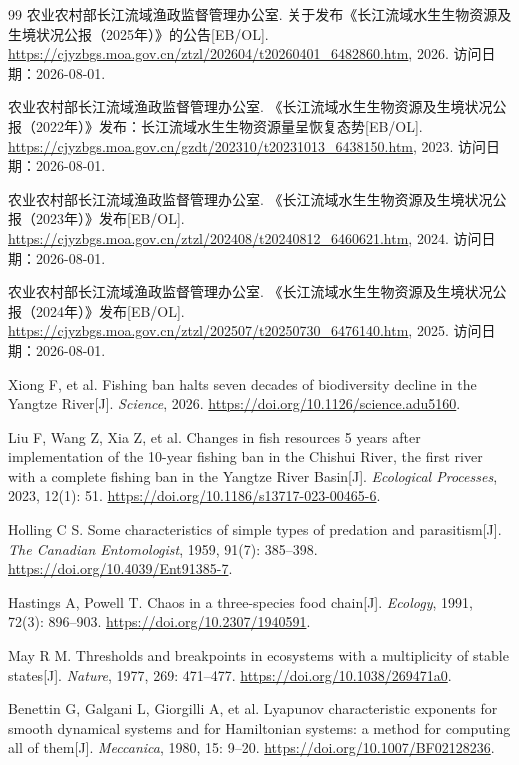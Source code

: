 \documentclass[withoutpreface,bwprint]{cumcmthesis}
\begin{document}
\begin{thebibliography}{99}
农业农村部长江流域渔政监督管理办公室.
关于发布《长江流域水生生物资源及生境状况公报（2025年）》的公告[EB/OL].
\url{https://cjyzbgs.moa.gov.cn/ztzl/202604/t20260401_6482860.htm}, 2026. 访问日期：2026-08-01.

农业农村部长江流域渔政监督管理办公室.
《长江流域水生生物资源及生境状况公报（2022年）》发布：长江流域水生生物资源量呈恢复态势[EB/OL].
\url{https://cjyzbgs.moa.gov.cn/gzdt/202310/t20231013_6438150.htm}, 2023. 访问日期：2026-08-01.

农业农村部长江流域渔政监督管理办公室.
《长江流域水生生物资源及生境状况公报（2023年）》发布[EB/OL].
\url{https://cjyzbgs.moa.gov.cn/ztzl/202408/t20240812_6460621.htm}, 2024. 访问日期：2026-08-01.

农业农村部长江流域渔政监督管理办公室.
《长江流域水生生物资源及生境状况公报（2024年）》发布[EB/OL].
\url{https://cjyzbgs.moa.gov.cn/ztzl/202507/t20250730_6476140.htm}, 2025. 访问日期：2026-08-01.

Xiong F, et al. Fishing ban halts seven decades of biodiversity decline in the Yangtze River[J].
\textit{Science}, 2026. \url{https://doi.org/10.1126/science.adu5160}.

Liu F, Wang Z, Xia Z, et al. Changes in fish resources 5 years after implementation of the 10-year fishing ban in the Chishui River, the first river with a complete fishing ban in the Yangtze River Basin[J].
\textit{Ecological Processes}, 2023, 12(1): 51.
\url{https://doi.org/10.1186/s13717-023-00465-6}.

Holling C S. Some characteristics of simple types of predation and parasitism[J].
\textit{The Canadian Entomologist}, 1959, 91(7): 385--398.
\url{https://doi.org/10.4039/Ent91385-7}.

Hastings A, Powell T. Chaos in a three-species food chain[J].
\textit{Ecology}, 1991, 72(3): 896--903.
\url{https://doi.org/10.2307/1940591}.

May R M. Thresholds and breakpoints in ecosystems with a multiplicity of stable states[J].
\textit{Nature}, 1977, 269: 471--477.
\url{https://doi.org/10.1038/269471a0}.

Benettin G, Galgani L, Giorgilli A, et al. Lyapunov characteristic exponents for smooth dynamical systems and for Hamiltonian systems: a method for computing all of them[J].
\textit{Meccanica}, 1980, 15: 9--20.
\url{https://doi.org/10.1007/BF02128236}.


\end{thebibliography}
\end{document}
